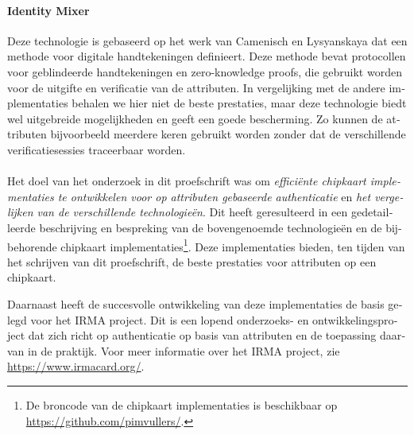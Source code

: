 \begin{otherlanguage}{dutch}
\paragraph{Identity Mixer}
Deze technologie is gebaseerd op het werk van Camenisch en Lysyanskaya dat een 
methode voor digitale handtekeningen definieert. Deze methode bevat protocollen
voor geblindeerde handtekeningen en zero-knowledge proofs, die gebruikt worden 
voor de uitgifte en verificatie van de attributen. In vergelijking met de andere
implementaties behalen we hier niet de beste prestaties, maar deze technologie 
biedt wel uitgebreide mogelijkheden en geeft een goede bescherming. Zo kunnen de
attributen bijvoorbeeld meerdere keren gebruikt worden zonder dat de 
verschillende verificatiesessies traceerbaar worden.

\paragraph{}
Het doel van het onderzoek in dit proefschrift was om \emph{effici\"{e}nte 
chipkaart implementaties te ontwikkelen voor op attributen gebaseerde 
authenticatie} en \emph{het vergelijken van de verschillende technologie\"{e}n}.
Dit heeft geresulteerd in een gedetailleerde beschrijving en bespreking van de 
bovengenoemde technologie\"{e}n en de bijbehorende chipkaart implementaties\footnote{De broncode van de chipkaart implementaties is beschikbaar op \url{https://github.com/pimvullers/}.}. Deze implementaties bieden, ten tijden van het schrijven van dit proefschrift, de beste prestaties voor 
attributen op een chipkaart.

Daarnaast heeft de succesvolle ontwikkeling van deze implementaties de basis
gelegd voor het IRMA project. Dit is een lopend onderzoeks- en 
ontwikkelingsproject dat zich richt op authenticatie op basis van attributen en 
de toepassing daarvan in de praktijk. Voor meer informatie over het IRMA 
project, zie \url{https://www.irmacard.org/}.

\end{otherlanguage}

\cleardoublepage
